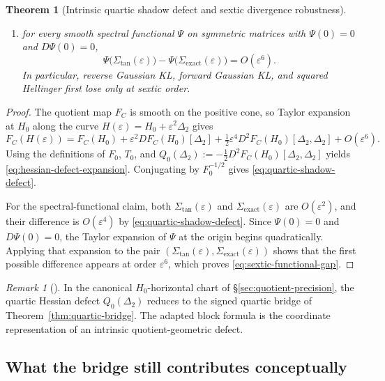 \documentclass[11pt]{article}
\numberwithin{equation}{section}
\newcommand{\eps}{\varepsilon}
\theoremstyle{thmcompact}
\newtheorem{theorem}{Theorem}[section]
\theoremstyle{remark}
\newtheorem*{remarkplain}{Remark}
\newenvironment{remark}[1][]%
{\begin{remarkbox}\begin{remarkplain}[#1]\normalfont}
		{\end{remarkplain}\end{remarkbox}}
\begin{document}
\begin{theorem}[Intrinsic quartic shadow defect and sextic divergence robustness]
\begin{enumerate}
\begin{equation}
\qquad
M_0 := F_0^{-1/2}\, Q_0(\Delta_2)\, F_0^{-1/2} \succeq 0;
\label{eq:quartic-shadow-defect}
\end{equation}
\item for every smooth spectral functional $\Psi$ on symmetric matrices with $\Psi(0) = 0$ and $D\Psi(0) = 0$,
\begin{equation}
\Psi\!\bigl(\Sigma_{\mathrm{tan}}(\eps)\bigr) - \Psi\!\bigl(\Sigma_{\mathrm{exact}}(\eps)\bigr) = O(\eps^6).
\label{eq:sextic-functional-gap}
\end{equation}
In particular, reverse Gaussian KL, forward Gaussian KL, and squared Hellinger first lose only at sextic order.
\end{enumerate}
\end{theorem}

\begin{proof}
The quotient map $F_C$ is smooth on the positive cone, so Taylor expansion at $H_0$ along the curve $H(\eps)=H_0+\eps^2\Delta_2$ gives
\[
F_C(H(\eps))
=
F_C(H_0)+\eps^2 DF_C(H_0)[\Delta_2]+\tfrac12\eps^4 D^2F_C(H_0)[\Delta_2,\Delta_2]+O(\eps^6).
\]
Using the definitions of $F_0$, $T_0$, and $Q_0(\Delta_2):=-\tfrac12 D^2F_C(H_0)[\Delta_2,\Delta_2]$ yields \eqref{eq:hessian-defect-expansion}. Conjugating by $F_0^{-1/2}$ gives \eqref{eq:quartic-shadow-defect}.

For the spectral-functional claim, both $\Sigma_{\mathrm{tan}}(\eps)$ and $\Sigma_{\mathrm{exact}}(\eps)$ are $O(\eps^2)$, and their difference is $O(\eps^4)$ by \eqref{eq:quartic-shadow-defect}. Since $\Psi(0)=0$ and $D\Psi(0)=0$, the Taylor expansion of $\Psi$ at the origin begins quadratically. Applying that expansion to the pair $(\Sigma_{\mathrm{tan}}(\eps),\Sigma_{\mathrm{exact}}(\eps))$ shows that the first possible difference appears at order $\eps^6$, which proves \eqref{eq:sextic-functional-gap}.
\end{proof}

\begin{remark}
In the canonical $H_0$-horizontal chart of \S\ref{sec:quotient-precision}, the quartic Hessian defect $Q_0(\Delta_2)$ reduces to the signed quartic bridge of Theorem~\ref{thm:quartic-bridge}. The adapted block formula is the coordinate representation of an intrinsic quotient-geometric defect.
\end{remark}

\subsection{What the bridge still contributes conceptually}
\end{document}
